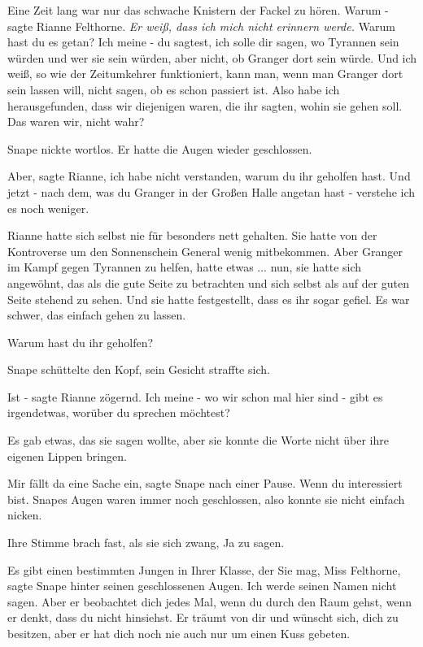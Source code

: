 Eine Zeit lang war nur das schwache Knistern der Fackel zu hören. \glqq Warum
-\grqq{} sagte Rianne Felthorne.\emph{ Er weiß, dass ich mich nicht erinnern
werde.} \glqq Warum hast du es getan? Ich meine - du sagtest, ich solle dir
sagen, wo Tyrannen sein würden und wer sie sein würden, aber nicht, ob Granger
dort sein würde. Und ich weiß, so wie der Zeitumkehrer funktioniert, kann man,
wenn man Granger dort sein lassen will, nicht sagen, ob es schon passiert ist.
Also habe ich herausgefunden, dass wir diejenigen waren, die ihr sagten, wohin
sie gehen soll. Das waren wir, nicht wahr?\grqq{}

Snape nickte wortlos. Er hatte die Augen wieder geschlossen.

\glqq Aber\grqq{}, sagte Rianne, \glqq ich habe nicht verstanden, warum du ihr
geholfen hast. Und jetzt - nach dem, was du Granger in der Großen Halle angetan
hast - verstehe ich es noch weniger.\grqq{}

Rianne hatte sich selbst nie für besonders nett gehalten. Sie hatte von der
Kontroverse um den Sonnenschein General wenig mitbekommen. Aber Granger im Kampf
gegen Tyrannen zu helfen, hatte etwas ... nun, sie hatte sich angewöhnt, das als
die gute Seite zu betrachten und sich selbst als auf der guten Seite stehend zu
sehen. Und sie hatte festgestellt, dass es ihr sogar gefiel. Es war schwer, das
einfach gehen zu lassen.

\glqq Warum hast du ihr geholfen?\grqq{}

Snape schüttelte den Kopf, sein Gesicht straffte sich.

\glqq Ist -\grqq{} sagte Rianne zögernd. \glqq Ich meine - wo wir schon mal hier
sind - gibt es irgendetwas, worüber du sprechen möchtest?\grqq{}

Es gab etwas, das sie sagen wollte, aber sie konnte die Worte nicht über ihre
eigenen Lippen bringen.

\glqq Mir fällt da eine Sache ein\grqq{}, sagte Snape nach einer Pause. \glqq
Wenn du interessiert bist.\grqq{} Snapes Augen waren immer noch geschlossen,
also konnte sie nicht einfach nicken.

Ihre Stimme brach fast, als sie sich zwang, \glqq Ja\grqq{} zu sagen.

\glqq Es gibt einen bestimmten Jungen in Ihrer Klasse, der Sie mag, Miss
Felthorne\grqq{}, sagte Snape hinter seinen geschlossenen Augen. \glqq Ich werde
seinen Namen nicht sagen. Aber er beobachtet dich jedes Mal, wenn du durch den
Raum gehst, wenn er denkt, dass du nicht hinsiehst. Er träumt von dir und
wünscht sich, dich zu besitzen, aber er hat dich noch nie auch nur um einen Kuss
gebeten.\grqq{}

